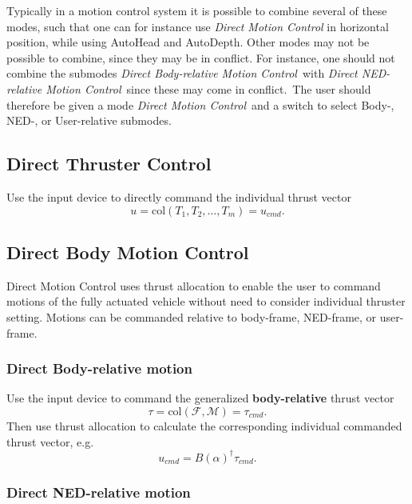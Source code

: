 \documentclass[a4paper,twoside,english]{report}
\begin{document}
Typically in a motion control system it is possible to combine several
of these modes, such that one can for instance use \emph{Direct Motion
Control} in horizontal position, while using AutoHead and AutoDepth.
Other modes may not be possible to combine, since they may be in conflict.
For instance, one should not combine the submodes \emph{Direct Body-relative
Motion Control}\ with \emph{Direct NED-relative Motion Control}\ since
these may come in conflict.\ The user should therefore be given a
mode \emph{Direct Motion Control}\ and a switch to select Body-,
NED-, or User-relative submodes.\ 

\subsection{\label{subsec:Direct-Thruster-Control}Direct Thruster Control}

Use the input device to directly command the individual thrust vector
\[
u=\text{col}\left(T_{1},T_{2},\ldots,T_{m}\right)=u_{cmd}.
\]


\subsection{Direct Body Motion Control}

Direct Motion Control uses thrust allocation to enable the user to
command motions of the fully actuated vehicle without need to consider
individual thruster setting. Motions can be commanded relative to
body-frame, NED-frame, or user-frame.

\subsubsection{\label{subsec:Direct-Body-relative-motion}Direct Body-relative motion}

Use the input device to command the generalized \textbf{body-relative}
thrust vector 
\begin{equation}
\tau=\text{col}\left(\mathcal{F},\mathcal{M}\right)=\tau_{cmd}.
\end{equation}
Then use thrust allocation to calculate the corresponding individual
commanded thrust vector, e.g. 
\begin{equation}
u_{cmd}=B(\alpha)^{\dagger}\tau_{cmd}.
\end{equation}


\subsubsection{\label{subsec:Direct-NED-relative-motion}Direct NED-relative motion}
\end{document}
